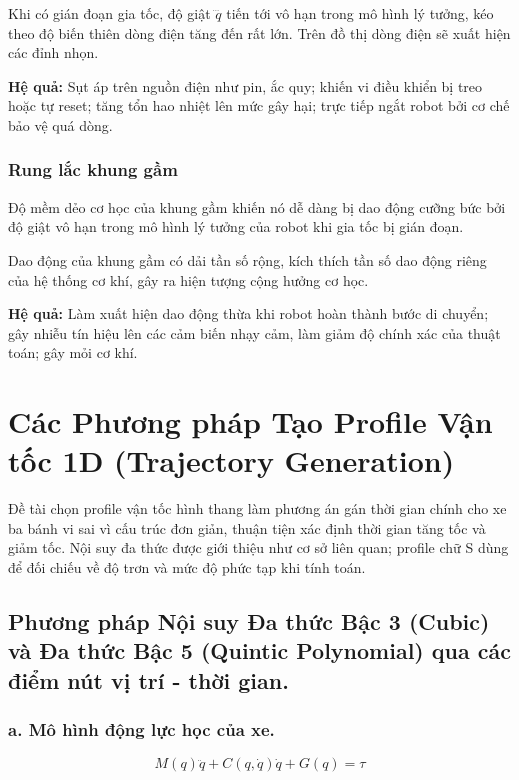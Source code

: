 \documentclass[12pt,a4paper,oneside]{report}
\begin{document}
Khi có gián đoạn gia tốc, độ giật \(\dddot{q}\) tiến tới vô hạn trong mô hình lý tưởng, kéo theo độ biến thiên dòng điện tăng đến rất lớn. Trên đồ thị dòng điện sẽ xuất hiện các đỉnh nhọn.

\textbf{Hệ quả:} Sụt áp trên nguồn điện như pin, ắc quy; khiến vi điều khiển bị treo hoặc tự reset; tăng tổn hao nhiệt lên mức gây hại; trực tiếp ngắt robot bởi cơ chế bảo vệ quá dòng.

\subsubsection{Rung lắc khung gầm}

Độ mềm dẻo cơ học của khung gầm khiến nó dễ dàng bị dao động cưỡng bức bởi độ giật vô hạn trong mô hình lý tưởng của robot khi gia tốc bị gián đoạn.

Dao động của khung gầm có dải tần số rộng, kích thích tần số dao động riêng của hệ thống cơ khí, gây ra hiện tượng cộng hưởng cơ học.

\textbf{Hệ quả:} Làm xuất hiện dao động thừa khi robot hoàn thành bước di chuyển; gây nhiễu tín hiệu lên các cảm biến nhạy cảm, làm giảm độ chính xác của thuật toán; gây mỏi cơ khí.

\setcounter{secnumdepth}{2}

\section{Các Phương pháp Tạo Profile Vận tốc 1D (Trajectory Generation)}

Đề tài chọn profile vận tốc hình thang làm phương án gán thời gian chính cho xe ba bánh vi sai vì cấu trúc đơn giản, thuận tiện xác định thời gian tăng tốc và giảm tốc. Nội suy đa thức được giới thiệu như cơ sở liên quan; profile chữ S dùng để đối chiếu về độ trơn và mức độ phức tạp khi tính toán.

\subsection{Phương pháp Nội suy Đa thức Bậc 3 (Cubic) và Đa thức Bậc 5 (Quintic Polynomial) qua các điểm nút vị trí - thời gian.}

\subsubsection*{a. Mô hình động lực học của xe.}

\[
M\left( q \right)\ddot{q}+C\left( q,\dot{q} \right)\dot{q}+G\left( q \right)=\tau 
\]
\end{document}
